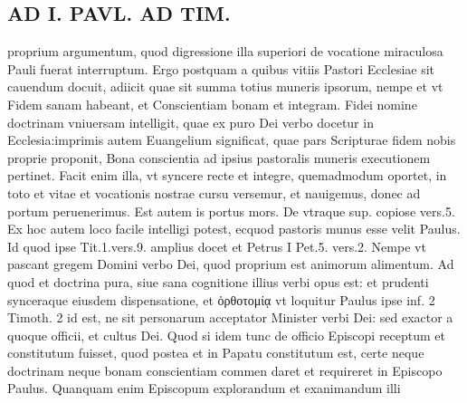 \documentclass{article}
\begin{document}
\begin{pages}
\section*{AD I. PAVL. AD TIM. }
\marginpar{[ p.34 ]}\pstart proprium argumentum, quod digressione illa superiori de vocatione miraculosa Pauli fuerat interruptum. Ergo postquam a quibus vitiis Pastori Ecclesiae sit cauendum docuit, adiicit quae sit summa totius muneris ipsorum, nempe et vt Fidem sanam habeant, et Conscientiam bonam et integram. Fidei nomine doctrinam vniuersam intelligit, quae ex puro Dei verbo docetur in Ecclesia:imprimis autem Euangelium significat, quae pars Scripturae fidem nobis proprie proponit, Bona conscientia ad ipsius pastoralis muneris executionem pertinet. Facit enim illa, vt syncere recte et integre, quemadmodum oportet, in toto et vitae et vocationis nostrae cursu versemur, et nauigemus, donec ad portum peruenerimus. Est autem is portus mors. De vtraque sup. copiose vers.5. Ex hoc autem loco facile intelligi potest, ecquod pastoris munus esse velit Paulus. Id quod ipse Tit.1.vers.9. amplius docet et Petrus I Pet.5. vers.2. Nempe vt pascant gregem Domini verbo Dei, quod proprium est animorum alimentum. Ad quod et doctrina pura, siue sana cognitione illius verbi opus est: et prudenti synceraque eiusdem dispensatione, et ὀρθοτομίᾳ vt loquitur Paulus ipse inf. 2 Timoth. 2 id est, ne sit personarum acceptator Minister verbi Dei: sed exactor a quoque officii, et cultus Dei. Quod si idem tunc de officio Episcopi receptum et constitutum fuisset, quod postea et in Papatu constitutum est, certe neque doctrinam neque bonam conscientiam commen daret et requireret in Episcopo Paulus. Quanquam enim Episcopum explorandum et exanimandum illi  \pend

\end{pages}
\end{document}
